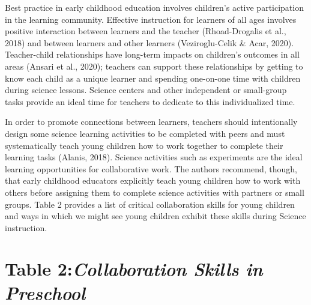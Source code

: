 \documentclass[11.5pt]{sig-alternate}
\begin{document}
\begin{large}
Best practice in early childhood education involves children’s active participation in the learning community. Effective instruction for learners of all ages involves positive interaction between learners and the teacher (Rhoad-Drogalis et al., 2018) and between learners and other learners (Veziroglu-Celik \& Acar, 2020). Teacher-child relationships have long-term impacts on children’s outcomes in all areas (Ansari et al., 2020); teachers can support these relationships by getting to know each child as a unique learner and spending one-on-one time with children during science lessons. Science centers and other independent or small-group tasks provide an ideal time for teachers to dedicate to this individualized time.

In order to promote connections between learners, teachers should intentionally design some science learning activities to be completed with peers and must systematically teach young children how to work together to complete their learning tasks (Alanis, 2018). Science activities such as experiments are the ideal learning opportunities for collaborative work. The authors recommend, though, that early childhood educators explicitly teach young children how to work with others before assigning them to complete science activities with partners or small groups. Table 2 provides a list of critical collaboration skills for young children and ways in which we might see young children exhibit these skills during Science instruction.

\section*{Table 2:\textit{Collaboration Skills in Preschool}}


\end{large}
\end{document}

